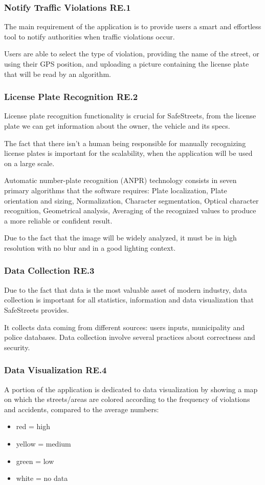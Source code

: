 \subsubsection{Notify Traffic Violations RE.1}
The main requirement of the application is to provide users a smart and effortless tool to notify authorities when traffic violations occur.

Users are able to select the type of violation, providing the name of the street, or using their GPS position, and uploading a picture containing the license plate that will be read by an algorithm.

\subsubsection{License Plate Recognition RE.2}
License plate recognition functionality is crucial for SafeStreets, from the license plate we can get information about the owner, the vehicle and its specs.

The fact that there isn't a human being responsible for manually recognizing license plates is important for the scalability, when the application will be used on a large scale.

Automatic number-plate recognition (ANPR) technology consists in seven primary algorithms that the software requires: Plate localization, Plate orientation and sizing, Normalization, Character segmentation, Optical character recognition, Geometrical analysis, Averaging of the recognized values to produce a more reliable or confident result.

Due to the fact that the image will be widely analyzed, it must be in high resolution with no blur and in a good lighting context.

\subsubsection{Data Collection RE.3}
Due to the fact that data is the most valuable asset of modern industry, data collection is important for all statistics, information and data visualization that SafeStreets provides.

It collects data coming from different sources: users inputs, municipality and police databases.
Data collection involve several practices about correctness and security.

\subsubsection{Data Visualization RE.4}
A portion of the application is dedicated to data visualization by showing a map on which the streets/areas are colored according to the frequency of violations and accidents, compared to the average numbers: 
\begin{itemize}
\item red = high
\item yellow = medium
\item green = low
\item white = no data
\end{itemize}

